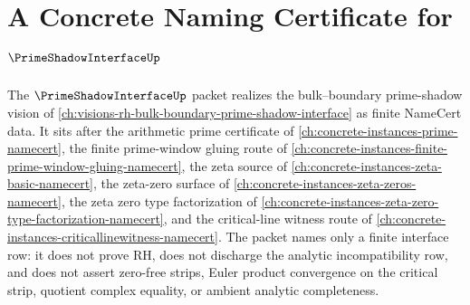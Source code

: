 \chapter{A Concrete Naming Certificate for $\PrimeShadowInterfaceUp$}
\label{ch:concrete-instances-prime-shadow-interface-namecert}

The $\PrimeShadowInterfaceUp$ packet realizes the bulk--boundary prime-shadow vision of \autoref{ch:visions-rh-bulk-boundary-prime-shadow-interface} as finite NameCert data. It sits after the arithmetic prime certificate of \autoref{ch:concrete-instances-prime-namecert}, the finite prime-window gluing route of \autoref{ch:concrete-instances-finite-prime-window-gluing-namecert}, the zeta source of \autoref{ch:concrete-instances-zeta-basic-namecert}, the zeta-zero surface of \autoref{ch:concrete-instances-zeta-zeros-namecert}, the zeta zero type factorization of \autoref{ch:concrete-instances-zeta-zero-type-factorization-namecert}, and the critical-line witness route of \autoref{ch:concrete-instances-criticallinewitness-namecert}. The packet names only a finite interface row: it does not prove RH, does not discharge the analytic incompatibility row, and does not assert zero-free strips, Euler product convergence on the critical strip, quotient complex equality, or ambient analytic completeness.

